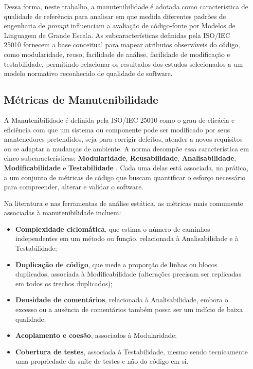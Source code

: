 Dessa forma, neste trabalho, a manutenibilidade é adotada como característica de qualidade de referência para analisar em que medida diferentes padrões de engenharia de \textit{prompt} influenciam a avaliação de código-fonte por Modelos de Linguagem de Grande Escala. As subcaracterísticas definidas pela ISO/IEC 25010 fornecem a base conceitual para mapear atributos observáveis do código, como modularidade, reuso, facilidade de análise, facilidade de modificação e testabilidade, permitindo relacionar os resultados dos estudos selecionados a um modelo normativo reconhecido de qualidade de software.

\subsection{Métricas de Manutenibilidade}
\label{sec:metricas-manutenibilidade}

A Manutenibilidade é definida pela ISO/IEC 25010 como o grau de eficácia e eficiência com que um sistema ou componente pode ser modificado por seus mantenedores pretendidos, seja para corrigir defeitos, atender a novos requisitos ou se adaptar a mudanças de ambiente. A norma decompõe essa característica em cinco subcaracterísticas: \textbf{Modularidade}, \textbf{Reusabilidade}, \textbf{Analisabilidade}, \textbf{Modificabilidade} e \textbf{Testabilidade} \cite{isoiec25000}. Cada uma delas está associada, na prática, a um conjunto de métricas de código que buscam quantificar o esforço necessário para compreender, alterar e validar o software.

Na literatura e nas ferramentas de análise estática, as métricas mais comumente associadas à manutenibilidade incluem:

\begin{itemize}
    \item \textbf{Complexidade ciclomática}, que estima o número de caminhos independentes em um método ou função, relacionada à Analisabilidade e à Testabilidade;
    \item \textbf{Duplicação de código}, que mede a proporção de linhas ou blocos duplicados, associada à Modificabilidade (alterações precisam ser replicadas em todos os trechos duplicados);
    \item \textbf{Densidade de comentários}, relacionada à Analisabilidade, embora o excesso ou a ausência de comentários também possa ser um indício de baixa qualidade;
    \item \textbf{Acoplamento e coesão}, associados à Modularidade;
    \item \textbf{Cobertura de testes}, associada à Testabilidade, mesmo sendo tecnicamente uma propriedade da suíte de testes e não do código em si.
\end{itemize}

